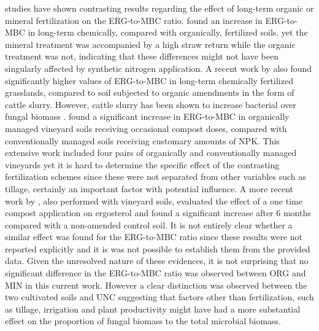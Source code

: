 \documentclass[12pt]{report}
\begin{document}
		studies have shown contrasting results regarding the effect of long-term organic or mineral fertilization on the ERG-to-MBC ratio. \citet{heinze2010} found an increase in ERG-to-MBC in long-term chemically, compared with organically, fertilized soils, yet the mineral treatment was accompanied by a high straw return while the organic treatment was not, indicating that these differences might not have been  singularly affected by synthetic nitrogen application. A recent work by \citet{knoblauch2017} also found significantly higher values of ERG-to-MBC in long-term chemically fertilized grasslands, compared to soil subjected to organic amendments in the form of cattle slurry. However, cattle slurry has been shown to increase bacterial over fungal biomass \citet{knoblauch2017}.
		\citet{probst2008} found a significant increase in ERG-to-MBC in organically managed vineyard soils receiving occasional compost doses, compared with conventionally managed soils receiving customary amounts of NPK. This extensive work included four pairs of organically and conventionally managed vineyards yet it is hard to determine the specific effect of the contrasting fertilization schemes since these were not separated from other variables such as tillage, certainly an important factor with potential influence. A more recent work by \citet{mackie2015} , also performed with vineyard soils, evaluated the effect of a one time compost application on ergosterol and found a significant increase after 6 months compared with a non-amended control soil. It is not entirely clear whether a similar effect was found for the ERG-to-MBC ratio since these results were not reported explicitly and it is was not possible to establish them from the provided data.
		Given the unresolved nature of these evidences, it is not surprising that no significant difference in the ERG-to-MBC ratio was observed between ORG and MIN in this current work. However a clear distinction was observed between the two cultivated soils and UNC suggesting that factors other than fertilization, such as tillage, irrigation and plant productivity might have had a more substantial effect on the proportion of fungal biomass to the total microbial biomass.
		
\end{document}
